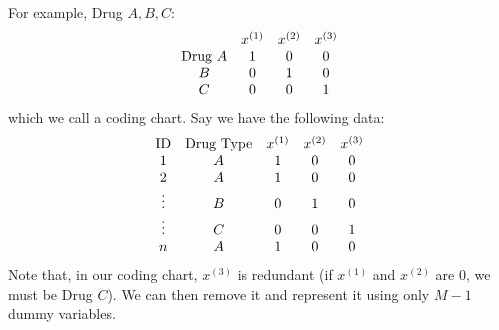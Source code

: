 \documentclass[12 pt]{article}
\begin{document}
  For example, Drug $A,B,C$:
  $$
  \begin{array}{c c c c}
    &x^{(1)}&x^{(2)}& x^{(3)}
    \\ \text{Drug } A & 1 & 0 & 0
    \\ B & 0 & 1 & 0
    \\ C & 0 & 0 & 1
  \end{array}
  $$ which we call a coding chart. Say we have the following data:
  $$
  \begin{array}{c c c c c}
    \text{ID}&\text{Drug Type}&x^{(1)}&x^{(2)}&x^{(3)}
    \\ 1 & A & 1 & 0 & 0
    \\ 2 & A & 1 & 0 & 0
    \\ \vdots & B & 0 & 1 & 0
    \\ \vdots & C & 0 & 0 & 1
    \\ n & A & 1 & 0 & 0
  \end{array}
  $$
  Note that, in our coding chart, $x^{(3)}$ is redundant (if $x^{(1)}$
  and $x^{(2)}$ are $0$, we must be Drug $C$). We can then remove it
  and represent it using only $M-1$ dummy variables.
\end{document}
